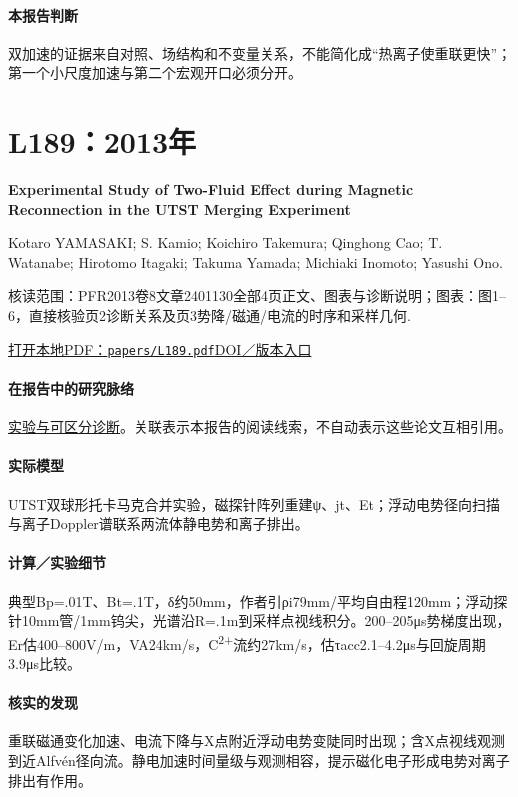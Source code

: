 \paragraph{本报告判断}双加速的证据来自对照、场结构和不变量关系，不能简化成“热离子使重联更快”；第一个小尺度加速与第二个宏观开口必须分开。

\section{L189：2013年}\label{paper:L189}

\textbf{Experimental Study of Two-Fluid Effect during Magnetic Reconnection in the UTST Merging Experiment}\citep{L189}\

Kotaro YAMASAKI;  S. Kamio;  Koichiro Takemura;  Qinghong Cao;  T. Watanabe;  Hirotomo Itagaki;  Takuma Yamada;  Michiaki Inomoto;  Yasushi Ono.

\textsf{核读范围：}PFR2013卷8文章2401130全部4页正文、图表与诊断说明；\textsf{图表：}图1–6，直接核验页2诊断关系及页3势降/磁通/电流的时序和采样几何.

\href{run:papers/L189.pdf}{打开本地PDF：\texttt{papers/L189.pdf}}\quad\href{https://doi.org/10.1585/pfr.8.2401130}{DOI／版本入口}

\paragraph{在报告中的研究脉络}\hyperref[story:diagnostic]{实验与可区分诊断}。关联表示本报告的阅读线索，不自动表示这些论文互相引用。

\paragraph{实际模型}UTST双球形托卡马克合并实验，磁探针阵列重建ψ、jt、Et；浮动电势径向扫描与离子Doppler谱联系两流体静电势和离子排出。

\paragraph{计算／实验细节}典型Bp=.01T、Bt=.1T，δ约50mm，作者引ρi79mm/平均自由程120mm；浮动探针10mm管/1mm钨尖，光谱沿R=.1m到采样点视线积分。200–205μs势梯度出现，Er估400–800V/m，VA24km/s，C\textsuperscript{2+}流约27km/s，估τacc2.1–4.2μs与回旋周期3.9μs比较。

\paragraph{核实的发现}重联磁通变化加速、电流下降与X点附近浮动电势变陡同时出现；含X点视线观测到近Alfvén径向流。静电加速时间量级与观测相容，提示磁化电子形成电势对离子排出有作用。

